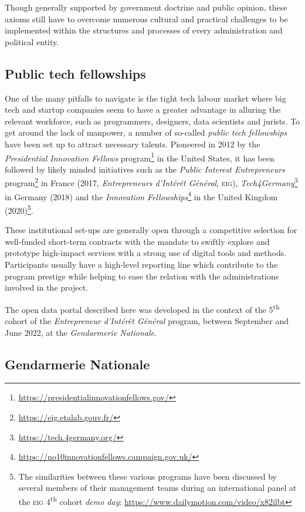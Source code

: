 \documentclass[11pt,a4paper,twocolumn,USenglish]{article}
\begin{document}
Though generally supported by government doctrine and public opinion, these axioms still have to overcome numerous cultural and practical challenges to be implemented within the structures and processes of every administration and political entity.


\subsection*{Public tech fellowships}

One of the many pitfalls to navigate is the tight tech labour market where big tech and startup companies seem to have a greater advantage in alluring the relevant workforce, such as programmers, designers, data scientists and jurists. To get around the lack of manpower, a number of so-called \emph{public tech fellowships} have been set up to attract necessary talents. Pioneered in 2012 by the \emph{Presidential Innovation Fellows} program\footnote{\url{https://presidentialinnovationfellows.gov/}} in the United States, it has been followed by likely minded initiatives such as  the \emph{Public Interest Entrepreneurs} program\footnote{\url{https://eig.etalab.gouv.fr/}} in France (2017, \emph{Entrepreneurs d'Intérêt Général}, \textsc{eig}),  \emph{Tech4Germany}\footnote{\url{https://tech.4germany.org/}} in Germany (2018) and the \emph{Innovation Fellowships}\footnote{\url{https://no10innovationfellows.campaign.gov.uk/}} in the United Kingdom (2020)\footnote{The similarities between these various programs have been discussed by several members of their management teams during an international panel at the \textsc{eig} 4\textsuperscript{th} cohort \emph{demo day}: \url{https://www.dailymotion.com/video/x82ilbt}}.

These institutional set-ups are generally open through a competitive selection for well-funded short-term contracts with the mandate to swiftly explore and prototype high-impact services with a strong use of digital tools and methods. Participants usually have a high-level reporting line which contribute to the program prestige while helping to ease the relation with the administrations involved in the project.

The open data portal described here was developed in the context of the 5\textsuperscript{th} cohort of the \emph{Entrepreneur d'Intérêt Général} program, between September and June 2022, at the \emph{Gendarmerie Nationale}.


\subsection*{Gendarmerie Nationale}
\end{document}
